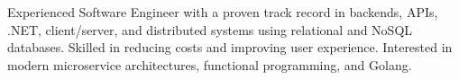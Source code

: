 

\begin{cvparagraph}

Experienced Software Engineer with a proven track record in backends, APIs, .NET, client/server, and distributed systems using relational and NoSQL databases. Skilled in reducing costs and improving user experience. Interested in modern microservice architectures, functional programming, and Golang.
\end{cvparagraph}
